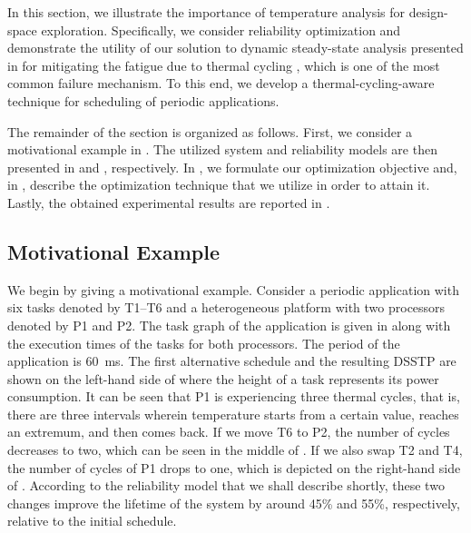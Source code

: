 In this section, we illustrate the importance of temperature analysis for
design-space exploration. Specifically, we consider reliability optimization and
demonstrate the utility of our solution to dynamic steady-state analysis
presented in  for mitigating the fatigue due to
thermal cycling \cite{jedec2010}, which is one of the most common failure
mechanism. To this end, we develop a thermal-cycling-aware technique for
scheduling of periodic applications.

The remainder of the section is organized as follows. First, we consider a
motivational example in . The utilized system and
reliability models are then presented in  and
, respectively. In , we
formulate our optimization objective and, in ,
describe the optimization technique that we utilize in order to attain it.
Lastly, the obtained experimental results are reported in
.

\subsection{Motivational Example}

We begin by giving a motivational example. Consider a periodic application with
six tasks denoted by T1--T6 and a heterogeneous platform with two processors
denoted by P1 and P2. The task graph of the application is given in
 along with the execution times of the tasks
for both processors. The period of the application is 60~ms. The first
alternative schedule and the resulting \acf{DSSTP} are shown on the left-hand
side of  where the height of a task represents its
power consumption. It can be seen that P1 is experiencing three thermal cycles,
that is, there are three intervals wherein temperature starts from a certain
value, reaches an extremum, and then comes back. If we move T6 to P2, the number
of cycles decreases to two, which can be seen in the middle of
. If we also swap T2 and T4, the number of cycles
of P1 drops to one, which is depicted on the right-hand side of
. According to the reliability model that we shall
describe shortly, these two changes improve the lifetime of the system by around
45\% and 55\%, respectively, relative to the initial schedule.

